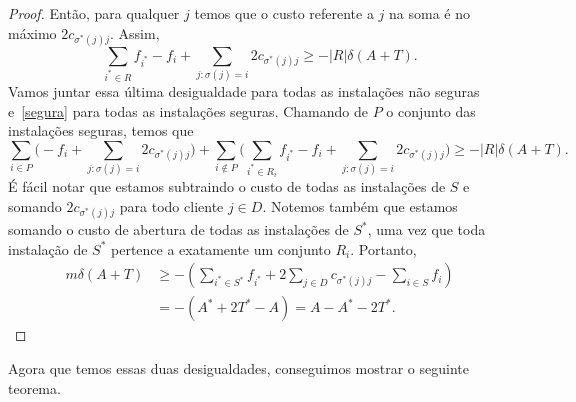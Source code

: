 \begin{proof}
    Então, para qualquer $j$ temos que o custo referente a $j$ na soma é no máximo $2c_{\sigma^*(j)j}$. Assim,
    \[\sum_{i^* \in R}f_{i^*} - f_i + \sum_{j: \sigma(j)= i } 2c_{\sigma^*(j)j} \geq - |R| \delta(A+T).\]
    Vamos juntar essa última desigualdade para todas as instalações não seguras e~\eqref{segura} para todas as instalações seguras. Chamando de $P$ o conjunto das instalações seguras, temos que
    \[\sum_{i \in P}\Big( - f_i + \sum_{j:\sigma(j) = i} 2c_{\sigma^*(j)j}\Big) + \sum_{i \not \in P}\Big( \sum_{i^* \in R_i}f_{i^*} - f_i + \sum_{j: \sigma(j)= i } 2c_{\sigma^*(j)j}\Big ) \geq - |R| \delta(A+T). \]
    É fácil notar que estamos subtraindo o custo de todas as instalações de $S$ e somando $2c_{\sigma^*(j)j}$ para todo cliente $j\in D$. Notemos também que estamos somando o custo de abertura de todas as instalações de $S^*$, uma vez que toda instalação de $S^*$ pertence a exatamente um conjunto $R_i$. Portanto,
    \begin{subequations}
        \begin{align*}
            m\delta(A+T) &\geq - (\sum_{i^* \in S^*}f_{i^*} + 2 \sum_{j \in D} c_{\sigma^*(j)j} - \sum_{i \in S} f_i)\\
            & = - ( A^* + 2 T^* - A ) = A - A^* - 2T^* .
        \end{align*}
    \end{subequations}
\end{proof}
Agora que temos essas duas desigualdades, conseguimos mostrar o seguinte teorema.

